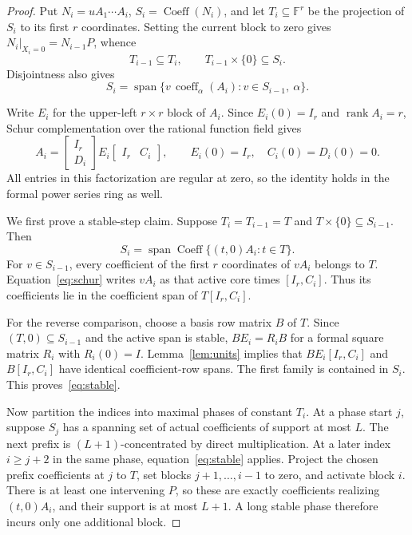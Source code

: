 \documentclass[11pt]{article}
\theoremstyle{definition}\newtheorem{definition}[theorem]{Definition}
\theoremstyle{remark}\newtheorem{remark}[theorem]{Remark}
\newcommand{\F}{\mathbb F}
\newcommand{\rank}{\operatorname{rank}}
\newcommand{\Span}{\operatorname{span}}
\newcommand{\Coeff}{\operatorname{Coeff}}
\begin{document}
\begin{proof}
Put $N_i=uA_1\cdots A_i$, $S_i=\Coeff(N_i)$, and let $T_i\subseteq\F^r$
be the projection of $S_i$ to its first $r$ coordinates. Setting the current
block to zero gives $N_i|_{X_i=0}=N_{i-1}P$, whence
\[
 T_{i-1}\subseteq T_i,\qquad T_{i-1}\times\{0\}\subseteq S_i.
\]
Disjointness also gives
\[
 S_i=\Span\{v\,\operatorname{coeff}_\alpha(A_i):v\in S_{i-1},\ \alpha\}.
\]

Write $E_i$ for the upper-left $r\times r$ block of $A_i$. Since
$E_i(0)=I_r$ and $\rank A_i=r$, Schur complementation over the rational
function field gives
\begin{equation}\label{eq:schur}
 A_i=\begin{bmatrix}I_r\\D_i\end{bmatrix}E_i
       \begin{bmatrix}I_r&C_i\end{bmatrix},
 \qquad E_i(0)=I_r,\quad C_i(0)=D_i(0)=0.
\end{equation}
All entries in this factorization are regular at zero, so the identity
holds in the formal power series ring as well.

We first prove a stable-step claim. Suppose $T_i=T_{i-1}=T$ and
$T\times\{0\}\subseteq S_{i-1}$. Then
\begin{equation}\label{eq:stable}
 S_i=\Span\Coeff\{(t,0)A_i:t\in T\}.
\end{equation}
For $v\in S_{i-1}$, every coefficient of the first $r$ coordinates of
$vA_i$ belongs to $T$. Equation~\eqref{eq:schur} writes $vA_i$ as that
active core times $[I_r,C_i]$. Thus its coefficients lie in the coefficient
span of $T[I_r,C_i]$.

For the reverse comparison, choose a basis row matrix $B$ of $T$. Since
$(T,0)\subseteq S_{i-1}$ and the active span is stable, $BE_i=R_iB$ for a
formal square matrix $R_i$ with $R_i(0)=I$. Lemma~\ref{lem:units} implies
that $BE_i[I_r,C_i]$ and $B[I_r,C_i]$ have identical coefficient-row spans.
The first family is contained in $S_i$. This proves~\eqref{eq:stable}.

Now partition the indices into maximal phases of constant $T_i$. At a
phase start $j$, suppose $S_j$ has a spanning set of actual coefficients
of support at most $L$. The next prefix is $(L+1)$-concentrated by direct
multiplication. At a later index $i\ge j+2$ in the same phase,
equation~\eqref{eq:stable} applies. Project the chosen prefix coefficients
at $j$ to $T$, set blocks $j+1,\ldots,i-1$ to zero, and activate block $i$.
There is at least one intervening $P$, so these are exactly coefficients
realizing $(t,0)A_i$, and their support is at most $L+1$. A long stable
phase therefore incurs only one additional block.


\end{proof}
\end{document}
